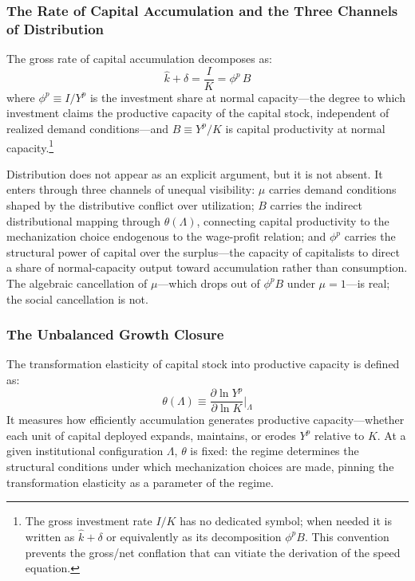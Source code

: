 \subsubsection{The Rate of Capital Accumulation and the Three Channels of Distribution}
\label{sec:rate_of_accumulation}

The gross rate of capital accumulation decomposes as:
%
\begin{equation}\label{eq:gross_rate}
	\hat{k} + \delta = \frac{I}{K} = \phi^p \, B
\end{equation}
%
where $\phi^p \equiv I/Y^p$ is the investment share at normal capacity---the degree to which investment claims the productive capacity of the capital stock, independent of realized demand conditions---and $B \equiv Y^p/K$ is capital productivity at normal capacity.\footnote{The gross investment rate $I/K$ has no dedicated symbol; when needed it is written as $\hat{k} + \delta$ or equivalently as its decomposition $\phi^p B$. This convention prevents the gross/net conflation that can vitiate the derivation of the speed equation.}

Distribution does not appear as an explicit argument, but it is not absent. It enters through three channels of unequal visibility: $\mu$ carries demand conditions shaped by the distributive conflict over utilization; $B$ carries the indirect distributional mapping through $\theta(\Lambda)$, connecting capital productivity to the mechanization choice endogenous to the wage-profit relation; and $\phi^p$ carries the structural power of capital over the surplus---the capacity of capitalists to direct a share of normal-capacity output toward accumulation rather than consumption. The algebraic cancellation of $\mu$---which drops out of $\phi^p B$ under $\mu = 1$---is real; the social cancellation is not.


\subsubsection{The Unbalanced Growth Closure}
\label{sec:unbalanced_growth_closure}

The transformation elasticity of capital stock into productive capacity is defined as:
%
\begin{equation}\label{eq:theta_def}
	\theta(\Lambda) \equiv \frac{\partial \ln Y^p}{\partial \ln K}\bigg|_\Lambda
\end{equation}
%
It measures how efficiently accumulation generates productive capacity---whether each unit of capital deployed expands, maintains, or erodes $Y^p$ relative to $K$. At a given institutional configuration $\Lambda$, $\theta$ is fixed: the regime determines the structural conditions under which mechanization choices are made, pinning the transformation elasticity as a parameter of the regime.

